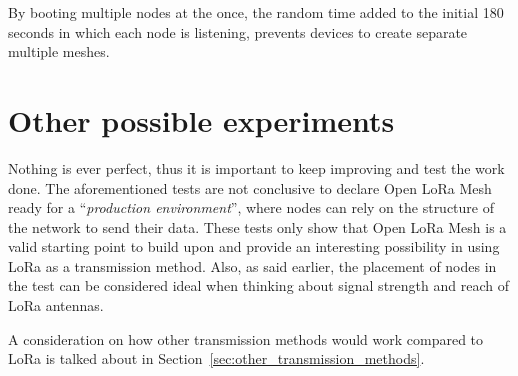 		By booting multiple nodes at the once, the random time added to the initial 180 seconds in which each node is listening, prevents devices to create separate multiple meshes.
	
	\section{Other possible experiments}
	
		Nothing is ever perfect, thus it is important to keep improving and test the work done.
		The aforementioned tests are not conclusive to declare Open LoRa Mesh ready for a ``\textit{production environment}'', where nodes can rely on the structure of the network to send their data.
		These tests only show that Open LoRa Mesh is a valid starting point to build upon and provide an interesting possibility in using LoRa as a transmission method.
		Also, as said earlier, the placement of nodes in the test can be considered ideal when thinking about signal strength and reach of LoRa antennas.
		
		A consideration on how other transmission methods would work compared to LoRa is talked about in Section~\ref{sec:other_transmission_methods}.